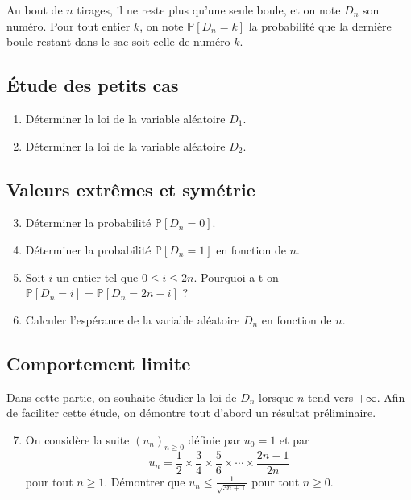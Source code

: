 \documentclass[landscape,twocolumn,leqno,a4paper,10pt]{report} %
\newcommand\n{\noindent}
\renewcommand{\geq}{\geqslant}
\renewcommand{\leq}{\leqslant}
\newcommand{\Prob}{\mathbb{P}}
\begin{document}
\n Au bout de $n$ tirages, il ne reste plus qu'une seule boule, et on note $D_{n}$ son numéro. Pour tout entier $k$, on note $\Prob\left[D_{n}=k\right]$ la probabilité que la dernière boule restant dans le sac soit celle de numéro $k$.

\subsection{Étude des petits cas}

\begin{enumerate}
  	\item Déterminer la loi de la variable aléatoire $D_{1}$.
  	\item Déterminer la loi de la variable aléatoire $D_{2}$.
\end{enumerate}

\subsection{Valeurs extrêmes et symétrie}


\begin{enumerate}\setcounter{enumi}{2}
  	\item Déterminer la probabilité $\Prob\left[D_{n}=0\right]$.
	\item Déterminer la probabilité $\Prob\left[D_{n}=1\right]$ en fonction de $n$.
  	\item Soit $i$ un entier tel que $0 \leq i \leq 2 n$. Pourquoi a-t-on $\Prob\left[D_{n}=i\right]=\Prob\left[D_{n}=2 n-i\right]$ ?
  \item Calculer l'espérance de la variable aléatoire $D_{n}$ en fonction de $n$.
\end{enumerate}

\subsection{Comportement limite}

\n Dans cette partie, on souhaite étudier la loi de $D_{n}$ lorsque $n$ tend vers $+\infty$. Afin de faciliter cette étude, on démontre tout d'abord un résultat préliminaire.


\begin{enumerate}\setcounter{enumi}{6}
  	\item On considère la suite $\left(u_{n}\right)_{n \geq 0}$ définie par $u_{0}=1$ et par
  	$$u_{n}=\frac{1}{2} \times \frac{3}{4} \times \frac{5}{6} \times \cdots \times \frac{2 n-1}{2 n}$$
  	pour tout $n \geq 1$. Démontrer que $u_{n} \leq \frac{1}{\sqrt{3 n+1}}$ pour tout $n \geq 0$.
\end{enumerate}
\end{document}
